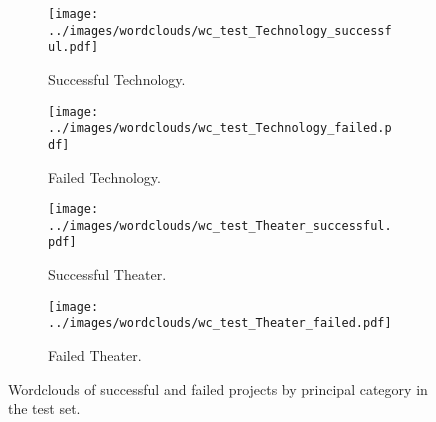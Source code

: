 \documentclass{article}
\begin{document}
\begin{figure}
\begin{subfigure}[m']{0.2\linewidth}
  \end{subfigure}
    \begin{subfigure}[n]{0.2\linewidth}
    \centering\texttt{[image: ../images/wordclouds/wc\_test\_Technology\_successful.pdf]}
    \caption{Successful Technology.}
    \label{fig:Technology_s_test}
  \end{subfigure} 
  \begin{subfigure}[n']{0.2\linewidth}
    \centering\texttt{[image: ../images/wordclouds/wc\_test\_Technology\_failed.pdf]}
    \caption{Failed Technology.}
    \label{fig:Technology_f_test}
  \end{subfigure}
    \begin{subfigure}[o]{0.2\linewidth}
    \centering\texttt{[image: ../images/wordclouds/wc\_test\_Theater\_successful.pdf]}
    \caption{Successful Theater.}
    \label{fig:Theater_s_test}
  \end{subfigure} 
  \begin{subfigure}[o']{0.2\linewidth}
    \centering\texttt{[image: ../images/wordclouds/wc\_test\_Theater\_failed.pdf]}
    \caption{Failed Theater.}
    \label{fig:Theater_f_test}
  \end{subfigure}

\caption{Wordclouds of successful and failed projects by principal category in the test set.}
\label{fig:wordclouds_test}
\end{figure}
\end{document}
